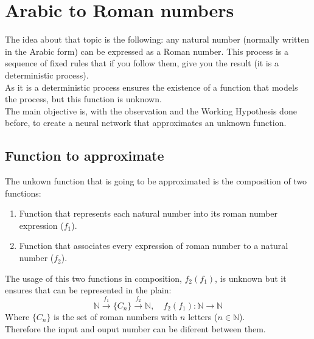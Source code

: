 \documentclass[a4paper, 11pt]{article}
\begin{document}
\section{Arabic to Roman numbers}
The idea about that topic is the following: any natural number (normally written in the Arabic form) can be expressed as a Roman number. This process is a sequence of fixed rules that if you follow them, give you the result (it is a deterministic process).\\
As it is a deterministic process ensures the existence of a function that models the process, but this function is unknown.\\
The main objective is, with the observation and the Working Hypothesis done before, to create a neural network that approximates an unknown function.
\subsection{Function to approximate}
The unkown function that is going to be approximated is the composition of two functions:
\begin{enumerate}
    \item Function that represents each natural number into its roman number expression ($f_1$).
    \item Function that associates every expression of roman number to a natural number ($f_2$).
\end{enumerate}
The usage of this two functions in composition, $f_2(f_1)$, is unknown but it ensures that can be represented in the plain:
$$\mathbb{N} \overset{f_1}{\longrightarrow} \{C_n\} \overset{f_2}{\longrightarrow} \mathbb{N}, \hspace{1em} f_2(f_1): \mathbb{N}\longrightarrow\mathbb{N}$$
Where $\{C_n\}$ is the set of roman numbers with $n$ letters ($n\in\mathbb{N}$).\\ 
Therefore the input and ouput number can be diferent between them.
\end{document}
